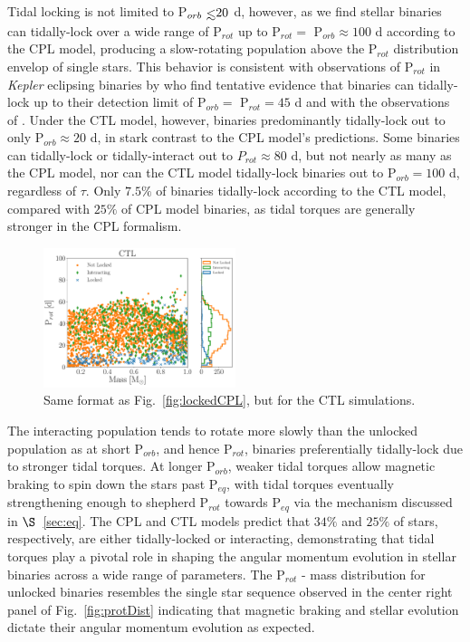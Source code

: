 \documentclass[twocolumn]{aastex61}
\def\lsim{~\rlap{$<$}{\lower 1.0ex\hbox{$\sim$}}}
\newcommand{\kepler}[0]{\textit{Kepler}\xspace}
\begin{document}
Tidal locking is not limited to P$_{orb} \lsim 20$ d, however, as we find stellar binaries can tidally-lock over a wide range of P$_{rot}$ up to P$_{rot} =$ P$_{orb} \approx 100$ d according to the CPL model, producing a slow-rotating population above the P$_{rot}$ distribution envelop of single stars. This behavior is consistent with observations of P$_{rot}$ in \kepler eclipsing binaries by \citet{Lurie2017} who find tentative evidence that binaries can tidally-lock up to their detection limit of P$_{orb} = $ P$_{rot} = 45$ d and with the observations of \citet{Abt2004}.  Under the CTL model, however, binaries predominantly tidally-lock out to only P$_{orb} \approx 20$ d, in stark contrast to the CPL model's predictions. Some binaries can tidally-lock or tidally-interact out to $P_{rot} \approx 80$ d, but not nearly as many as the CPL model, nor can the CTL model tidally-lock binaries out to P$_{orb} = 100$ d, regardless of $\tau$. Only $7.5\%$ of binaries tidally-lock according to the CTL model, compared with $25\%$ of CPL model binaries, as tidal torques are generally stronger in the CPL formalism.   

\begin{figure}
	\includegraphics[width=0.5\textwidth]{../Plots/lockedCTL.pdf}
   \caption{Same format as Fig.~\ref{fig:lockedCPL}, but for the CTL simulations. }%
    \label{fig:lockedCTL}%
\end{figure}

The interacting population tends to rotate more slowly than the unlocked population as at short P$_{orb}$, and hence P$_{rot}$, binaries preferentially tidally-lock due to stronger tidal torques.  At longer P$_{orb}$, weaker tidal torques allow magnetic braking to spin down the stars past P$_{eq}$, with tidal torques eventually strengthening enough to shepherd P$_{rot}$ towards P$_{eq}$ via the mechanism discussed in $\S$~\ref{sec:eq}. The CPL and CTL models predict that $34\%$ and $25\%$ of stars, respectively, are either tidally-locked or interacting, demonstrating that tidal torques play a pivotal role in shaping the angular momentum evolution in stellar binaries across a wide range of parameters. The P$_{rot}$ - mass distribution for unlocked binaries resembles the single star sequence observed in the center right panel of Fig.~\ref{fig:protDist} indicating that magnetic braking and stellar evolution dictate their angular momentum evolution as expected.
\end{document}
